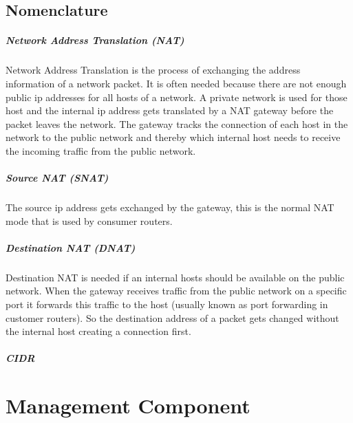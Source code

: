 \documentclass{report}
\begin{document}
\section{Nomenclature}\label{nomenclature}

\paragraph{Network Address Translation (NAT)}

Network Address Translation is the process of exchanging the address
information of a network packet. It is often needed because there are
not enough public ip addresses for all hosts of a network. A private
network is used for those host and the internal ip address gets
translated by a NAT gateway before the packet leaves the network. The
gateway tracks the connection of each host in the network to the public
network and thereby which internal host needs to receive the incoming
traffic from the public network.

\paragraph{Source NAT (SNAT)}

The source ip address gets exchanged by the gateway, this is the normal
NAT mode that is used by consumer routers.

\paragraph{Destination NAT (DNAT)}

Destination NAT is needed if an internal hosts should be available on
the public network. When the gateway receives traffic from the public
network on a specific port it forwards this traffic to the host (usually
known as port forwarding in customer routers). So the destination
address of a packet gets changed without the internal host creating a
connection first.

\paragraph{CIDR} 


\chapter{Management Component}\label{management-component}
\end{document}
